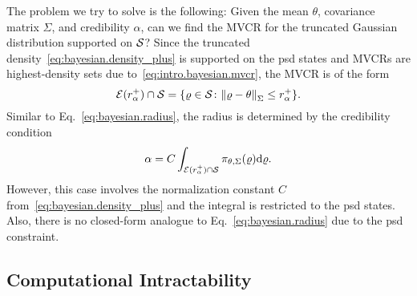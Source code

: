 The problem we try to solve is the following:
Given the mean $\theta$, covariance matrix $\Sigma$, and credibility $\alpha$, can we find the MVCR for the truncated Gaussian distribution supported on $\mathcal{S}$?
Since the truncated density~\eqref{eq:bayesian.density_plus} is supported on the psd states and MVCRs are highest-density sets due to~\eqref{eq:intro.bayesian.mvcr}, the MVCR is of the form
\begin{equation}
  \mathcal{E}(r^+_{\alpha}) \cap \mathcal{S} = \{ \varrho \in \mathcal{S} \colon {\Vert\varrho - \theta\Vert}_\Sigma \le r^+_{\alpha} \}.
  \label{eq:bayesian.mvcr}
\end{equation}
Similar to Eq.~\eqref{eq:bayesian.radius}, the radius is determined by the credibility condition
\begin{equation}
  \label{eq:bayesian.radius_plus}
  \alpha = C \int_{\mathcal{E}(r^+_{\alpha}) \cap \mathcal{S}} \pi_{\theta,\Sigma}(\varrho) \mathrm{d} \varrho.
\end{equation}
However, this case involves the normalization constant $C$ from~\eqref{eq:bayesian.density_plus} and the integral is restricted to the psd states.
Also, there is no closed-form analogue to Eq.~\eqref{eq:bayesian.radius} due to the psd constraint.

\subsection{Computational Intractability}
\label{sub:bayesian.hard}

